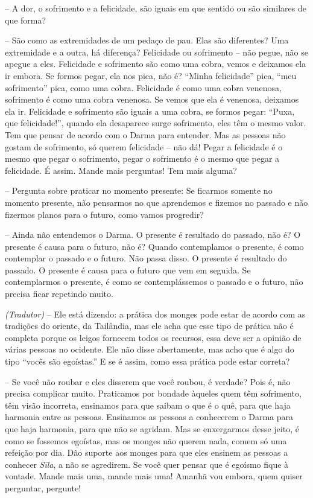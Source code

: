 -- A dor, o sofrimento e a felicidade, são iguais em que sentido ou
são similares de que forma?

-- São como as extremidades de um pedaço de pau. Elas são
diferentes? Uma extremidade e a outra, há diferença? Felicidade ou
sofrimento – não pegue, não se apegue a eles. Felicidade e sofrimento
são como uma cobra, vemos e deixamos ela ir embora. Se formos pegar,
ela nos pica, não é? “Minha felicidade” pica, “meu sofrimento” pica,
como uma cobra. Felicidade é como uma cobra venenosa, sofrimento é como
uma cobra venenosa. Se vemos que ela é venenosa, deixamos ela ir.
Felicidade e sofrimento são iguais a uma cobra, se formos pegar: “Puxa,
que felicidade!”, quando ela desaparece surge sofrimento, eles têm o
mesmo valor. Tem que pensar de acordo com o Darma para entender. Mas as
pessoas não gostam de sofrimento, só querem felicidade – não dá! Pegar
a felicidade é o mesmo que pegar o sofrimento, pegar o sofrimento é o
mesmo que pegar a felicidade. É assim. Mande mais perguntas! Tem mais
alguma?

-- Pergunta sobre praticar no momento presente: Se ficarmos somente
no momento presente, não pensarmos no que aprendemos e fizemos no
passado e não fizermos planos para o futuro, como vamos progredir?

-- Ainda não entendemos o Darma. O presente é resultado do passado,
não é? O presente é causa para o futuro, não é? Quando contemplamos o
presente, é como contemplar o passado e o futuro. Não passa disso. O
presente é resultado do passado. O presente é causa para o futuro que
vem em seguida. Se contemplarmos o presente, é como se contemplássemos
o passado e o futuro, não precisa ficar repetindo muito.

\textit{(Tradutor)} -- Ele está dizendo: a prática dos monges pode
estar de acordo com as tradições do oriente, da Tailândia, mas ele acha
que esse tipo de prática não é completa porque os leigos fornecem todos
os recursos, essa deve ser a opinião de várias pessoas no ocidente. Ele
não disse abertamente, mas acho que é algo do tipo “vocês são
egoístas.” E se é assim, como essa prática pode estar correta?

-- Se você não roubar e eles disserem que você roubou, é verdade?
Pois é, não precisa complicar muito. Praticamos por bondade àqueles
quem têm sofrimento, têm visão incorreta, ensinamos para que saibam o
que é o quê, para que haja harmonia entre as pessoas. Ensinamos as
pessoas a conhecerem o Darma para que haja harmonia, para que não se
agridam. Mas se enxergarmos desse jeito, é como se fossemos egoístas,
mas os monges não querem nada, comem só uma refeição por dia. Dão
suporte aos monges para que eles ensinem as pessoas a conhecer
\textit{Sīla}, a não se agredirem. Se você quer pensar que é egoísmo
fique à vontade. Mande mais uma, mande mais uma! Amanhã vou embora,
quem quiser perguntar, pergunte!

